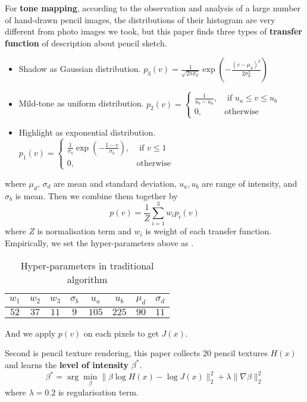 For \textbf{tone mapping}, according to the observation and analysis of a large number of hand-drawn pencil images, the distributions of their histogram are very different from photo images we took, but this paper finds three types of \textbf{transfer function} of description about pencil sketch.
\begin{itemize}
  \item Shadow as Gaussian distribution. \(p_{3}(v) = \frac{1}{\sqrt{2 \pi \sigma_{d}}}{\exp\left(-\frac{(v - \mu_{d})^{2}}{2 \sigma_{d}^{2}}\right)}\)
  \item Mild-tone as uniform distribution. \(p_{2}(v) =
  \begin{cases}
  \frac{1}{u_{b}-u_{a}}, & \mbox{ if } u_{a} \leq v \leq u_{b}\\
  0, & \mbox{otherwise}
  \end{cases}\)
  \item Highlight as exponential distribution.  \(p_{1}(v) =
  \begin{cases}
  \frac{1}{\sigma_{b}} \exp \left(-\frac{1 - v}{\sigma_{b}} \right), & \mbox{ if } v \leq 1\\
  0, & \mbox{otherwise}
  \end{cases}\)
\end{itemize}
where \(\mu_{d}\), \(\sigma_{d}\) are mean and standard deviation, \(u_{a}, u_{b}\) are range of intensity, and \(\sigma_{b}\) is mean. Then we combine them together by \[
p(v) = \frac{1}{Z}\sum_{i=1}^{3} w_{i} p_{i}(v)
\]
where \(Z\) is normalisation term and \(w_{i}\) is weight of each transfer function.
Empirically, we set the hyper-parameters above as .
\begin{table}[h!]
\centering
\begin{tabular}{c c c c c c c c} 
 \hline
 \(w_{1}\) & \(w_{2}\) & \(w_{3}\) & \(\sigma_{b}\) & \(u_{a}\) & \(u_{b}\) & \(\mu_{d}\) & \(\sigma_{d}\) \\ [0.5ex] 
 \hline\hline
 \(52\) & \(37\) & \(11\) & \(9\) & \(105\) & \(225\) & \(90\) & \(11\) \\ 
 \hline
\end{tabular}
\caption{Hyper-parameters in traditional algorithm}
\label{table:1}
\end{table}
And we apply \(p(v)\) on each pixels to get \(J(x)\).

Second is pencil texture rendering, this paper collects \(20\) pencil textures \(H(x)\) and learns the \textbf{level of intensity} \(\beta^{\ast}\).
\[
\beta^{\ast} = \arg \min_{\beta} \|\beta \log H(x) - \log J(x) \|^{2}_{2} + \lambda \|\nabla \beta \|^{2}_{2}
\]
where \(\lambda=0.2\) is regularisation term.

